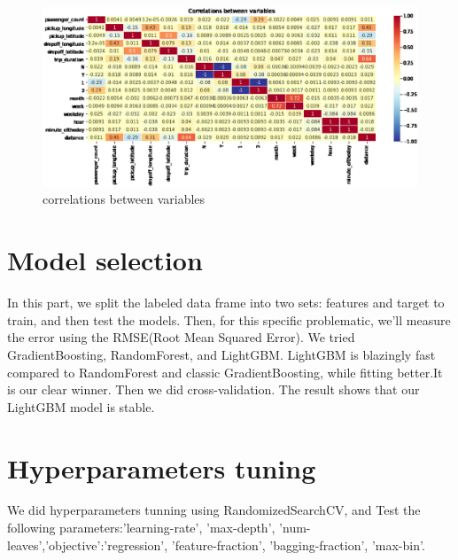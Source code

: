 \begin{figure}[h]
	\centering
	\includegraphics[scale=0.3]{correlations between variables.eps}
	\caption{correlations between variables}
\end{figure}

\section{Model selection} \label{sec-Model selection}

In this part, we split the labeled data frame into two sets: features and target to train, and then test the models. Then, for this specific problematic, we'll measure the error using the RMSE(Root Mean Squared Error). We tried GradientBoosting, RandomForest, and LightGBM. LightGBM is blazingly fast compared to RandomForest and classic GradientBoosting, while fitting better.It is our clear winner. Then we did cross-validation. The result shows that our LightGBM model is stable.

\section{Hyperparameters tuning} \label{sec-Hyperparameters tuning}
We did hyperparameters tunning using RandomizedSearchCV, and Test the following parameters:'learning-rate', 'max-depth', 'num-leaves','objective':'regression', 'feature-fraction', 'bagging-fraction', 'max-bin'.
